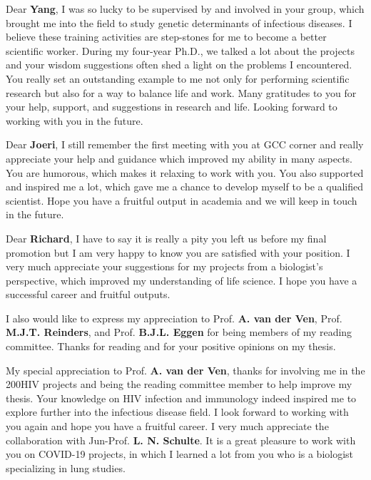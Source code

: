 \documentclass{book}
\begin{document}
\begin{refsection}
Dear \textbf{Yang}, I was so lucky to be supervised by and involved in your group, which brought me into the field to study genetic determinants of infectious diseases.
I believe these training activities are step-stones for me to become a better scientific worker.
During my four-year Ph.D., we talked a lot about the projects and your wisdom suggestions often shed a light on the problems I encountered.
You really set an outstanding example to me not only for performing scientific research but also for a way to balance life and work.
Many gratitudes to you for your help, support, and suggestions in research and life.
Looking forward to working with you in the future.

Dear \textbf{Joeri}, I still remember the first meeting with you at GCC corner and really appreciate your help and guidance which improved my ability in many aspects.
You are humorous, which makes it relaxing to work with you.
You also supported and inspired me a lot, which gave me a chance to develop myself to be a qualified scientist.
Hope you have a fruitful output in academia and we will keep in touch in the future.

Dear \textbf{Richard}, I have to say it is really a pity you left us before my final promotion but I am very happy to know you are satisfied with your position.
I very much appreciate your suggestions for my projects from a biologist's perspective, which improved my understanding of life science.
I hope you have a successful career and fruitful outputs.

I also would like to express my appreciation to Prof. \textbf{A. van der Ven}, Prof. \textbf{M.J.T. Reinders}, and Prof. \textbf{B.J.L. Eggen} for being members of my reading committee.
Thanks for reading and for your positive opinions on my thesis.

My special appreciation to Prof. \textbf{A. van der Ven}, thanks for involving me in the 200HIV projects and being the reading committee member to help improve my thesis.
Your knowledge on HIV infection and immunology indeed inspired me to explore further into the infectious disease field.
I look forward to working with you again and hope you have a fruitful career.
I very much appreciate the collaboration with Jun-Prof. \textbf{L. N. Schulte}.
It is a great pleasure to work with you on COVID-19 projects, in which I learned a lot from you who is a biologist specializing in lung studies.


\end{refsection}
\end{document}
